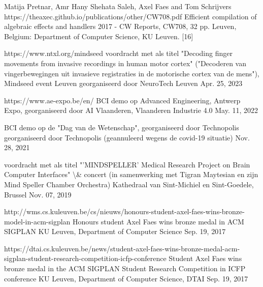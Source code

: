 \begin{cvpapers}
\end{cvpapers}\begin{cvpapers}
\cvpaper 
{Matija Pretnar, Amr Hany Shehata Saleh, Axel Faes and Tom Schrijvers}
{https://theaxec.github.io/publications/other/CW708.pdf}
{Efficient compilation of algebraic effects and handlers}
{2017 - CW Reports, CW708, 32 pp. Leuven, Belgium: Department of Computer Science, KU Leuven.}
{[16]}


\end{cvpapers}\begin{cvnews}
\cvnew 
{https://www.ntxl.org/mindseed}
{voordracht met als titel "Decoding finger movements from invasive recordings in human motor cortex" ("Decoderen van vingerbewegingen uit invasieve registraties in de motorische cortex van de mens"), Mindseed event Leuven}
{georganiseerd door NeuroTech Leuven}
{Apr. 25, 2023}

\cvnew 
{https://www.ae-expo.be/en/}
{BCI demo op Advanced Engineering, Antwerp Expo,}
{georganiseerd door AI Vlaanderen, Vlaanderen Industrie 4.0}
{May. 11, 2022}

\cvnew 
{}
{BCI demo op de "Dag van de Wetenschap", georganiseerd door Technopolis}
{georganiseerd door Technopolis (geannuleerd wegens de covid-19 situatie)}
{Nov. 28, 2021}

\cvnew 
{}
{voordracht met als titel "'MINDSPELLER’ Medical Research Project on Brain Computer Interfaces" \textbackslash{}\& concert (in samenwerking met Tigran Maytesian en zijn Mind Speller Chamber Orchestra)}
{Kathedraal van Sint-Michiel en Sint-Goedele, Brussel}
{Nov. 07, 2019}

\cvnew 
{http://wms.cs.kuleuven.be/cs/nieuws/honours-student-axel-faes-wins-bronze-model-in-acm-sigplan}
{Honours student Axel Faes wins bronze medal in ACM SIGPLAN}
{KU Leuven, Department of Computer Science}
{Sep. 19, 2017}

\cvnew 
{https://dtai.cs.kuleuven.be/news/student-axel-faes-wins-bronze-medal-acm-sigplan-student-research-competition-icfp-conference}
{Student Axel Faes wins bronze medal in the ACM SIGPLAN Student Research Competition in ICFP conference}
{KU Leuven, Department of Computer Science, DTAI}
{Sep. 19, 2017}


\end{cvnews}
